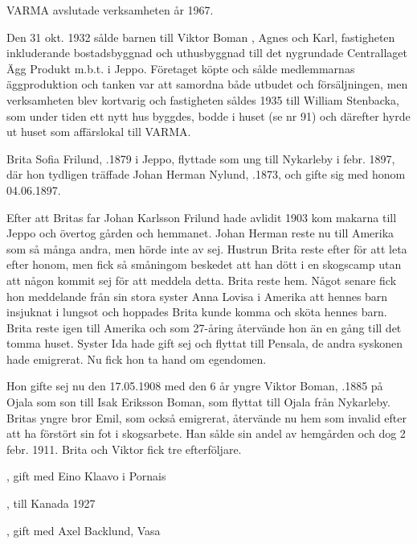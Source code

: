 VARMA avslutade verksamheten år 1967.


%
Den 31 okt. 1932 sålde barnen till Viktor Boman , Agnes och Karl, fastigheten inkluderande bostadsbyggnad och uthusbyggnad till det nygrundade Centrallaget Ägg Produkt m.b.t. i Jeppo. Företaget köpte och sålde medlemmarnas äggproduktion och tanken var att samordna både utbudet och försäljningen, men verksamheten blev kortvarig och fastigheten såldes 1935 till William Stenbacka, som under tiden ett nytt hus byggdes, bodde i huset (se nr 91) och därefter hyrde ut huset som affärslokal till VARMA.


%
Brita Sofia Frilund, .1879 i Jeppo, flyttade som ung  till Nykarleby i febr. 1897, där hon tydligen träffade Johan Herman Nylund, .1873, och gifte sig med honom 04.06.1897.

Efter att Britas far Johan Karlsson Frilund hade avlidit 1903 kom makarna till Jeppo och övertog gården och hemmanet. Johan Herman reste nu till Amerika som så många andra, men hörde inte av sej. Hustrun Brita reste efter för att leta efter honom, men fick så  småningom beskedet att han dött i en skogscamp utan att någon kommit sej för att meddela detta. Brita reste hem. Något senare fick hon meddelande från sin stora syster Anna Lovisa i Amerika att hennes barn insjuknat i lungsot och hoppades Brita kunde komma och sköta hennes barn. Brita reste igen till Amerika och som 27-åring återvände hon än en gång till det tomma huset. Syster Ida hade gift sej och flyttat till Pensala, de andra syskonen hade emigrerat. Nu fick hon ta hand om egendomen.


%
Hon gifte sej nu den 17.05.1908 med den 6 år yngre Viktor Boman, .1885 på Ojala som son till Isak Eriksson Boman, som flyttat till Ojala från Nykarleby. Britas yngre bror Emil, som också emigrerat, återvände nu hem som invalid efter att ha förstört sin fot i skogsarbete. Han sålde sin andel av hemgården och dog 2 febr. 1911. Brita och Viktor fick tre efterföljare.
\begin{jhchildren}
  \item {}, gift med Eino Klaavo i Pornais
  \item {}, till Kanada 1927
  \item {}, gift med Axel Backlund, Vasa
\end{jhchildren}

